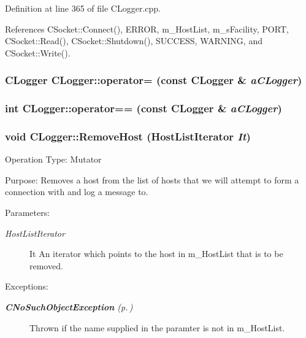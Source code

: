 Definition at line 365 of file CLogger.cpp.

References CSocket::Connect(), ERROR, m\_\-Host\-List, m\_\-s\-Facility, PORT, CSocket::Read(), CSocket::Shutdown(), SUCCESS, WARNING, and CSocket::Write().
\subsubsection{\setlength{\rightskip}{0pt plus 5cm}CLogger CLogger::operator= (const CLogger \& {\em a\-CLogger})\hspace{0.3cm}{\tt  [private]}}\label{classCLogger_c0}


\subsubsection{\setlength{\rightskip}{0pt plus 5cm}int CLogger::operator== (const CLogger \& {\em a\-CLogger})\hspace{0.3cm}{\tt  [private]}}\label{classCLogger_c1}


\subsubsection{\setlength{\rightskip}{0pt plus 5cm}void CLogger::Remove\-Host ({\bf Host\-List\-Iterator} {\em It})}\label{classCLogger_a9}


Operation Type: Mutator

Purpose: Removes a host from the list of hosts that we will attempt to form a connection with and log a message to.\begin{Desc}
\item[Parameters: ]\par
\begin{description}
\item[{\em 
Host\-List\-Iterator}]It An iterator which points to the host in m\_\-Host\-List that is to be removed. \end{description}
\end{Desc}
\begin{Desc}
\item[Exceptions: ]\par
\begin{description}
\item[{\em 
{\bf CNo\-Such\-Object\-Exception} {\rm (p.\,\pageref{classCNoSuchObjectException})}}] Thrown if the name supplied in the paramter is not in m\_\-Host\-List. \end{description}
\end{Desc}


